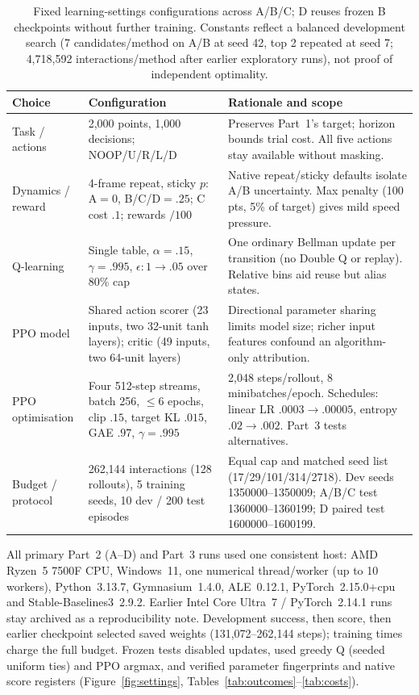 \begin{table}[H]
\centering\small
\begin{tabularx}{\linewidth}{@{}p{.21\linewidth}XX@{}}
\toprule
Choice & Configuration & Rationale and scope \\
\midrule
Task / actions & 2,000 points, 1,000 decisions; NOOP/U/R/L/D & Preserves Part~1's target; horizon bounds trial cost. All five actions stay available without masking. \\
Dynamics / reward & 4-frame repeat, sticky $p$: A$=0$, B/C/D$=.25$; C cost $.1$; rewards $/100$ & Native repeat/sticky defaults isolate A/B uncertainty. Max penalty (100 pts, 5\% of target) gives mild speed pressure. \\
Q-learning & Single table, $\alpha=.15$, $\gamma=.995$, $\epsilon: 1\to.05$ over 80\% cap & One ordinary Bellman update per transition (no Double Q or replay). Relative bins aid reuse but alias states. \\
PPO model & Shared action scorer (23 inputs, two 32-unit tanh layers); critic (49 inputs, two 64-unit layers) & Directional parameter sharing limits model size; richer input features confound an algorithm-only attribution. \\
PPO optimisation & Four 512-step streams, batch 256, $\le 6$ epochs, clip $.15$, target KL $.015$, GAE $.97$, $\gamma=.995$ & 2,048 steps/rollout, 8 minibatches/epoch. Schedules: linear LR $.0003\to.00005$, entropy $.02\to.002$. Part~3 tests alternatives. \\
Budget / protocol & 262,144 interactions (128 rollouts), 5 training seeds, 10 dev / 200 test episodes & Equal cap and matched seed list (17/29/101/314/2718). Dev seeds 1350000--1350009; A/B/C test 1360000--1360199; D paired test 1600000--1600199. \\
\bottomrule
\end{tabularx}
\caption{Fixed learning-settings configurations across A/B/C; D reuses frozen B checkpoints without further training. Constants reflect a balanced development search (7 candidates/method on A/B at seed 42, top 2 repeated at seed 7; 4,718,592 interactions/method after earlier exploratory runs), not proof of independent optimality.}
\label{tab:config}
\end{table}

All primary Part~2 (A--D) and Part~3 runs used one consistent host: AMD Ryzen~5 7500F CPU,
Windows~11, one numerical thread/worker (up to 10 workers), Python~3.13.7, Gymnasium~1.4.0,
ALE~0.12.1, PyTorch~2.15.0+cpu and Stable-Baselines3~2.9.2. Earlier Intel Core Ultra~7 /
PyTorch~2.14.1 runs stay archived as a reproducibility note. Development success, then score,
then earlier checkpoint selected saved weights (131,072--262,144 steps); training times charge
the full budget. Frozen tests disabled updates, used greedy Q (seeded uniform ties) and PPO
argmax, and verified parameter fingerprints and native score registers (Figure~\ref{fig:settings},
Tables~\ref{tab:outcomes}--\ref{tab:costs}).

